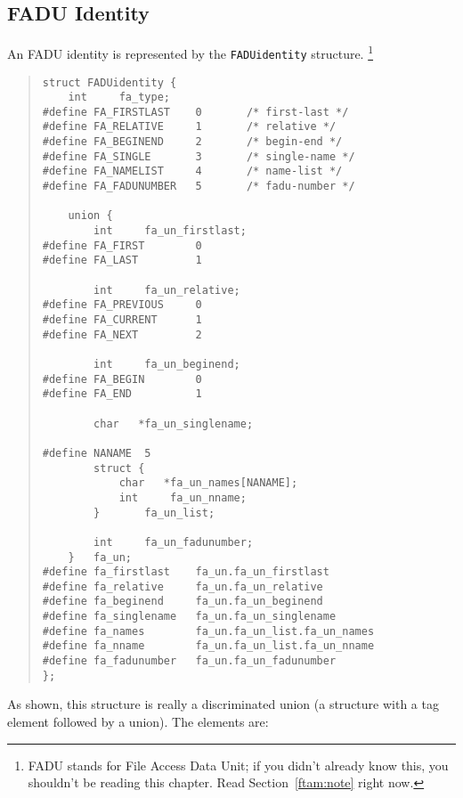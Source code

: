 \subsection	{FADU Identity}
An FADU identity is represented by the \verb"FADUidentity" structure.%
\footnote{FADU stands for File Access Data Unit;
if you didn't already know this, you shouldn't be reading this chapter.
Read Section~\ref{ftam:note} right now.}
\begin{quote}\small\begin{verbatim}
struct FADUidentity {
    int     fa_type;
#define FA_FIRSTLAST    0       /* first-last */
#define FA_RELATIVE     1       /* relative */
#define FA_BEGINEND     2       /* begin-end */
#define FA_SINGLE       3       /* single-name */
#define FA_NAMELIST     4       /* name-list */
#define FA_FADUNUMBER   5       /* fadu-number */

    union {
        int     fa_un_firstlast;
#define FA_FIRST        0
#define FA_LAST         1

        int     fa_un_relative;
#define FA_PREVIOUS     0
#define FA_CURRENT      1
#define FA_NEXT         2

        int     fa_un_beginend;
#define FA_BEGIN        0
#define FA_END          1

        char   *fa_un_singlename;

#define NANAME  5
        struct {
            char   *fa_un_names[NANAME];
            int     fa_un_nname;
        }       fa_un_list;

        int     fa_un_fadunumber;
    }   fa_un;
#define fa_firstlast    fa_un.fa_un_firstlast
#define fa_relative     fa_un.fa_un_relative
#define fa_beginend     fa_un.fa_un_beginend
#define fa_singlename   fa_un.fa_un_singlename
#define fa_names        fa_un.fa_un_list.fa_un_names
#define fa_nname        fa_un.fa_un_list.fa_un_nname
#define fa_fadunumber   fa_un.fa_un_fadunumber
};
\end{verbatim}\end{quote}
As shown, this structure is really a discriminated union
(a structure with a tag element followed by a union).
The elements are:

